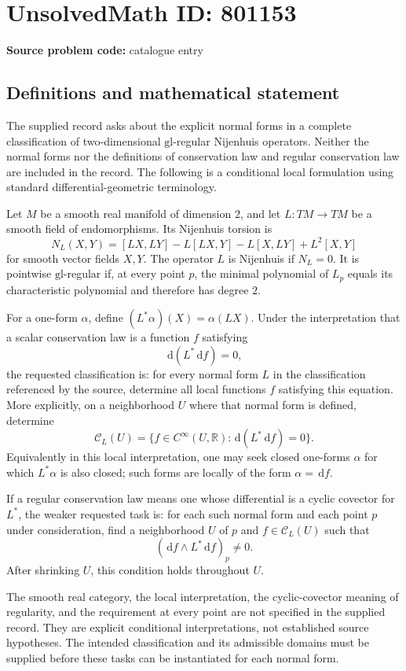 \documentclass[11pt]{article}
\newcommand{\R}{\mathbb{R}}
\newcommand{\dd}{\,\mathrm{d}}
\begin{document}
\section*{UnsolvedMath ID: 801153}
\textbf{Source problem code:} catalogue entry
\subsection{Definitions and mathematical statement}
The supplied record asks about the explicit normal forms in a complete classification of two-dimensional $\mathrm{gl}$-regular Nijenhuis operators. Neither the normal forms nor the definitions of conservation law and regular conservation law are included in the record. The following is a conditional local formulation using standard differential-geometric terminology.

Let $M$ be a smooth real manifold of dimension $2$, and let $L\colon TM\to TM$ be a smooth field of endomorphisms. Its Nijenhuis torsion is
\[
N_L(X,Y)=[LX,LY]-L[LX,Y]-L[X,LY]+L^2[X,Y]
\]
for smooth vector fields $X,Y$. The operator $L$ is Nijenhuis if $N_L=0$. It is pointwise $\mathrm{gl}$-regular if, at every point $p$, the minimal polynomial of $L_p$ equals its characteristic polynomial and therefore has degree $2$.

For a one-form $\alpha$, define $(L^*\alpha)(X)=\alpha(LX)$. Under the interpretation that a scalar conservation law is a function $f$ satisfying
\[
\dd(L^*\dd f)=0,
\]
the requested classification is: for every normal form $L$ in the classification referenced by the source, determine all local functions $f$ satisfying this equation. More explicitly, on a neighborhood $U$ where that normal form is defined, determine
\[
\mathcal C_L(U)=\{f\in C^\infty(U,\R):\dd(L^*\dd f)=0\}.
\]
Equivalently in this local interpretation, one may seek closed one-forms $\alpha$ for which $L^*\alpha$ is also closed; such forms are locally of the form $\alpha=\dd f$.

If a regular conservation law means one whose differential is a cyclic covector for $L^*$, the weaker requested task is: for each such normal form and each point $p$ under consideration, find a neighborhood $U$ of $p$ and $f\in\mathcal C_L(U)$ such that
\[
(\dd f\wedge L^*\dd f)_p\ne0.
\]
After shrinking $U$, this condition holds throughout $U$.

The smooth real category, the local interpretation, the cyclic-covector meaning of regularity, and the requirement at every point are not specified in the supplied record. They are explicit conditional interpretations, not established source hypotheses. The intended classification and its admissible domains must be supplied before these tasks can be instantiated for each normal form.
\end{document}
